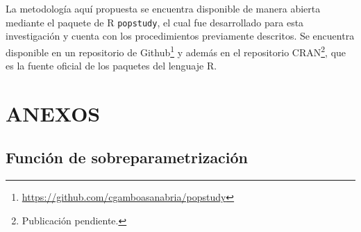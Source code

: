 \documentclass[
]{article}
\begin{document}
La metodología aquí propuesta se encuentra disponible de manera abierta
mediante el paquete de R \texttt{popstudy}, el cual fue desarrollado
para esta investigación y cuenta con los procedimientos previamente
descritos. Se encuentra disponible en un repositorio de
Github\footnote{\url{https://github.com/cgamboasanabria/popstudy}} y
además en el repositorio CRAN\footnote{Publicación pendiente.}, que es
la fuente oficial de los paquetes del lenguaje R.

\newpage

\section{ANEXOS}

\subsection{Función de sobreparametrización}

\label{funcion_op_arima}
\end{document}

